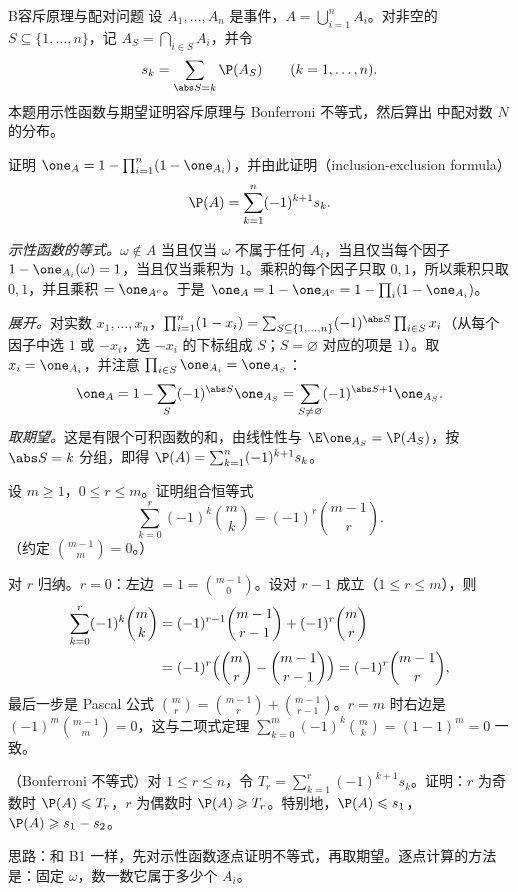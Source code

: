 \begin{probleme}{B}{容斥原理与配对问题}
设 $A_1,\dots,A_n$ 是事件，$A=\bigcup_{i=1}^nA_i$。对非空的 $S\subseteq\{1,\dots,n\}$，记 $A_S=\bigcap_{i\in S}A_i$，并令
\[
s_k=\sum_{\abs S=k}\P(A_S)\qquad(k=1,\dots,n).
\]
本题用示性函数与期望证明容斥原理与 Bonferroni 不等式，然后算出 中配对数 $N$ 的分布。
\begin{questions}
\item 证明 $\one_A=1-\prod_{i=1}^n(1-\one_{A_i})$，并由此证明（inclusion-exclusion formula）
\[
\P(A)=\sum_{k=1}^n(-1)^{k+1}s_k .
\]
\begin{solution}
\emph{示性函数的等式。}$\omega\notin A$ 当且仅当 $\omega$ 不属于任何 $A_i$，当且仅当每个因子 $1-\one_{A_i}(\omega)=1$，当且仅当乘积为 $1$。乘积的每个因子只取 $0,1$，所以乘积只取 $0,1$，并且乘积 $=\one_{A^c}$。于是 $\one_A=1-\one_{A^c}=1-\prod_i(1-\one_{A_i})$。

\emph{展开。}对实数 $x_1,\dots,x_n$，$\prod_{i=1}^n(1-x_i)=\sum_{S\subseteq\{1,\dots,n\}}(-1)^{\abs S}\prod_{i\in S}x_i$（从每个因子中选 $1$ 或 $-x_i$，选 $-x_i$ 的下标组成 $S$；$S=\varnothing$ 对应的项是 $1$）。取 $x_i=\one_{A_i}$，并注意 $\prod_{i\in S}\one_{A_i}=\one_{A_S}$：
\[
\one_A=1-\sum_S(-1)^{\abs S}\one_{A_S}=\sum_{S\neq\varnothing}(-1)^{\abs S+1}\one_{A_S}.
\]
\emph{取期望。}这是有限个可积函数的和，由线性性与 $\E\one_{A_S}=\P(A_S)$，按 $\abs S=k$ 分组，即得 $\P(A)=\sum_{k=1}^n(-1)^{k+1}s_k$。
\end{solution}

\item 设 $m\geqslant1$，$0\leqslant r\leqslant m$。证明组合恒等式
\[
\sum_{k=0}^r(-1)^k\binom mk=(-1)^r\binom{m-1}r .
\]
（约定 $\binom{m-1}{m}=0$。）
\begin{solution}
对 $r$ 归纳。$r=0$：左边 $=1=\binom{m-1}0$。设对 $r-1$ 成立（$1\leqslant r\leqslant m$），则
\[
\begin{aligned}
\sum_{k=0}^r(-1)^k\binom mk&=(-1)^{r-1}\binom{m-1}{r-1}+(-1)^r\binom mr\\
&=(-1)^r\Bigl(\binom mr-\binom{m-1}{r-1}\Bigr)=(-1)^r\binom{m-1}r,
\end{aligned}
\]
最后一步是 Pascal 公式 $\binom mr=\binom{m-1}r+\binom{m-1}{r-1}$。$r=m$ 时右边是 $(-1)^m\binom{m-1}m=0$，这与二项式定理 $\sum_{k=0}^m(-1)^k\binom mk=(1-1)^m=0$ 一致。
\end{solution}

\item （Bonferroni 不等式）对 $1\leqslant r\leqslant n$，令 $T_r=\sum_{k=1}^r(-1)^{k+1}s_k$。证明：$r$ 为奇数时 $\P(A)\leqslant T_r$，$r$ 为偶数时 $\P(A)\geqslant T_r$。特别地，$\P(A)\leqslant s_1$，$\P(A)\geqslant s_1-s_2$。
\begin{solution}
思路：和 B1 一样，先对示性函数逐点证明不等式，再取期望。逐点计算的方法是：固定 $\omega$，数一数它属于多少个 $A_i$。


\end{solution}
\end{questions}
\end{probleme}
